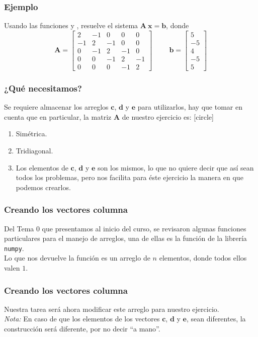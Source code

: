 \begin{frame}
\frametitle{Ejemplo}
Usando las funciones  y , resuelve el sistema $\mathbf{A \: x} = \mathbf{b}$, donde
\begin{equation*} 
\mathbf{A} =  \begin{bmatrix}
2 & -1 & 0 & 0 & 0 \\
-1 & 2 & -1 & 0 & 0 \\
0 & -1 & 2 & -1 & 0 \\
0 & 0 & -1 & 2 & -1 \\
0 & 0 & 0 & -1 & 2
\end{bmatrix}
\hspace{1cm}
\mathbf{b} =
\begin{bmatrix}
5 \\
-5 \\
4 \\
-5 \\
5
\end{bmatrix}
\end{equation*}
\end{frame}
\begin{frame}
\frametitle{¿Qué necesitamos?}
Se requiere almacenar los arreglos $\mathbf{c}$, $\mathbf{d}$ y $\mathbf{e}$ para utilizarlos, hay que tomar en cuenta que en particular, la matriz $\mathbf{A}$ de nuestro ejercicio es:
[circle]
\begin{enumerate}[<+->]
\item Simétrica.
\item Tridiagonal.
\item Los elementos de $\mathbf{c}$, $\mathbf{d}$ y $\mathbf{e}$ son los mismos, lo que no quiere decir que así sean todos los problemas, pero nos facilita para éste ejercicio la manera en que podemos crearlos.
\end{enumerate}
\end{frame}
\begin{frame}
\frametitle{Creando los vectores columna}
Del Tema 0 que presentamos al inicio del curso, se revisaron algunas funciones particulares para el manejo de arreglos, una de ellas es la función  de la librería \texttt{numpy}.
\\
\medskip
Lo que nos devuelve la función  es un arreglo de $n$ elementos, donde todos ellos valen $1$. 
\end{frame}
\begin{frame}
\frametitle{Creando los vectores columna}
Nuestra tarea será ahora modificar este arreglo para nuestro ejercicio. 
\\
\medskip
\emph{Nota: } En caso de que los elementos de los vectores $\mathbf{c}$, $\mathbf{d}$ y $\mathbf{e}$, sean diferentes, la construcción será diferente, por no decir \enquote{a mano}.
\end{frame}
